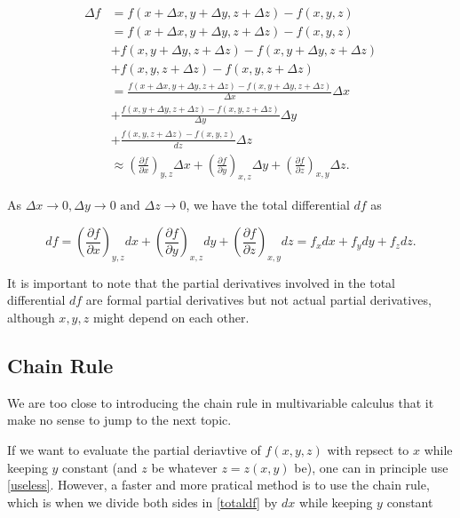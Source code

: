 \documentclass[english,a4paper,12pt]{report}
\begin{document}
\begin{equation}
	\begin{aligned} 
	\Delta f &= f(x+\Delta x,y+\Delta y,z+\Delta z) - f(x,y,z) \\
	&= f(x+\Delta x,y+\Delta y,z+\Delta z) - f(x,y,z) \\
	&+ f(x,y+\Delta y,z+\Delta z) -f(x,y+\Delta y,z+\Delta z) \\
	&+ f(x,y,z+\Delta z) - f(x,y,z+\Delta z)\\
	&= \frac{f(x+\Delta x,y+\Delta y,z+\Delta z) - f(x,y+\Delta y,z+\Delta z)}{\Delta x} \Delta x \\
	&+ \frac{f(x,y+\Delta y,z+\Delta z)-f(x,y,z+\Delta z)}{\Delta y}\Delta y \\
	&+ \frac{f(x,y,z+\Delta z)-f(x,y,z)}{dz} \Delta z\\
	& \approx  \left( \frac{\partial f}{\partial x} \right)_{y,z} \Delta x + \left( \frac{\partial f}{\partial y} \right)_{x,z} \Delta y + \left( \frac{\partial f}{\partial z} \right)_{x,y} \Delta z.  
	\end{aligned} 
\end{equation}

As \(\Delta x \to 0, \Delta y \to 0 \text { and } \Delta z \to 0\), we have the total differential \(df\) as 

\begin{equation} \label{totaldf} 
	df = \left( \frac{\partial f}{\partial x} \right)_{y,z} dx + \left( \frac{\partial f}{\partial y} \right)_{x,z} dy + \left( \frac{\partial f}{\partial z} \right)_{x,y} dz = f_{x} dx + f_{y}dy + f_{z}dz.     
\end{equation}

It is important to note that the partial derivatives involved in the total differential \(df\) are formal partial derivatives but not actual partial derivatives, although \(x,y,z\) might depend on each other.  

\subsection{Chain Rule}

We are too close to introducing the chain rule in multivariable calculus that it make no sense to jump to the next topic.

If we want to evaluate the partial deriavtive of \(f(x,y,z)\) with repsect to \(x\) while keeping \(y\) constant (and \(z\) be whatever \(z = z(x,y)\) be), one can in principle use \cref{useless}. However, a faster and more pratical method is to use the chain rule, which is when we divide both sides in \cref{totaldf} by \(dx\) while keeping \(y\) constant
\end{document}
